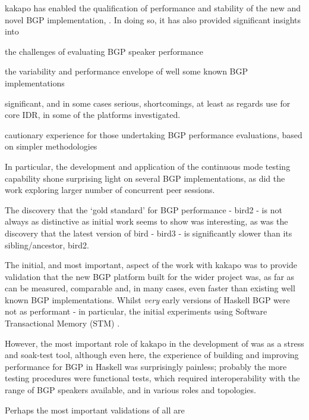 kakapo has enabled the qualification of performance and stability of the new and novel BGP implementation, \hbgp.  In doing so, it has also provided significant insights into
\begin{myitemize}
    \item the challenges of evaluating BGP speaker performance
    \item the variability and performance envelope of well some known BGP implementations
    \item significant, and in some cases serious, shortcomings, at least as regards use for core IDR, in some of the platforms investigated.
    \item cautionary experience for those undertaking BGP performance evaluations, based on simpler methodologies
\end{myitemize}

In particular, the development and application of the continuous mode testing capability shone surprising light on several BGP implementations, as did the work exploring larger number of concurrent peer sessions.

The discovery that the `gold standard' for BGP performance - bird2 - is not always as distinctive as initial work seems to show was interesting, as was the discovery that the latest version of bird - bird3 - is significantly slower than its sibling/ancestor, bird2.

The initial, and most important, aspect of the work with kakapo was to provide validation that the new BGP platform built for the wider project was, as far as can be measured, comparable and, in many cases, even faster than existing well known BGP implementations.
Whilst \textit{very} early versions of Haskell BGP were not as performant - in particular, the initial experiments using Software Transactional Memory (STM) \cite{GHC-STM} \cite{STM2005}.

However, the most important role of kakapo in the development of \hbgp was as a stress and soak-test tool, although even here, the experience of building and improving performance for BGP in Haskell was surprisingly painless; probably the more testing procedures were functional tests, which required interoperability with the range of BGP speakers available, and in various roles and topologies.

\bigskip

Perhaps the most important validations of all are  

